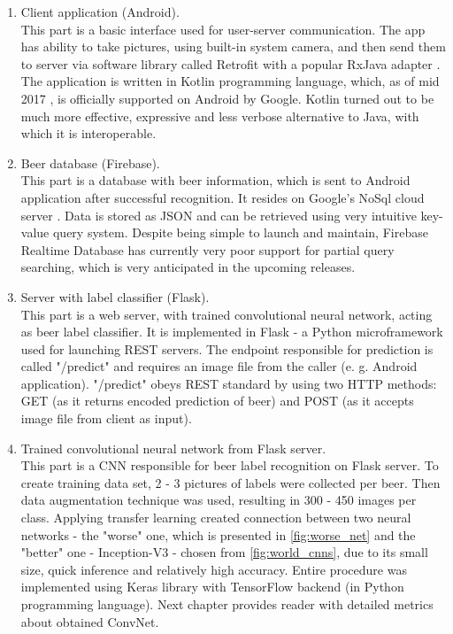 \documentclass[11pt]{article}
\begin{document}
\begin{enumerate}[1)]
\item Client application (Android).\\
This part is a basic interface used for user-server communication. The app has ability to take pictures, using built-in system camera, and then send them to server via software library called Retrofit \cite{retrofit_repo} with a popular RxJava adapter \cite{rxjava_repo}. The application is written in Kotlin programming language, which, as of mid 2017 \cite{kotlin_blogpost}, is officially supported on Android by Google. Kotlin turned out to be much more effective, expressive and less verbose alternative to Java, with which it is interoperable.

\item Beer database (Firebase).\\
This part is a database with beer information, which is sent to Android application after successful recognition. It resides on Google's NoSql cloud server \cite{nosql_def}. Data is stored as JSON and can be retrieved using very intuitive key-value query system. Despite being simple to launch and maintain, Firebase Realtime Database has currently very poor support for partial query searching, which is very anticipated in the upcoming releases.

\item Server with label classifier (Flask).\\
This part is a web server, with trained convolutional neural network, acting as beer label classifier. It is implemented in Flask - a Python microframework used for launching REST \cite{rest_def} servers. The endpoint responsible for prediction is called "/predict" and requires an image file from the caller (e. g. Android application). "/predict" obeys REST standard by using two HTTP methods: GET (as it returns encoded prediction of beer) and POST (as it accepts image file from client as input).

\item Trained convolutional neural network from Flask server.\\
This part is a CNN responsible for beer label recognition on Flask server. To create training data set, 2 - 3 pictures of labels were collected per beer. Then data augmentation technique was used, resulting in 300 - 450 images per class. Applying transfer learning created connection between two neural networks - the "worse" one, which is presented in \autoref{fig:worse_net} and the "better" one - Inception-V3 - chosen from \autoref{fig:world_cnns}, due to its small size, quick inference and relatively high accuracy. Entire procedure was implemented using Keras library with TensorFlow backend (in Python programming language). Next chapter provides reader with detailed metrics about obtained ConvNet. 
\end{enumerate}
\end{document}

